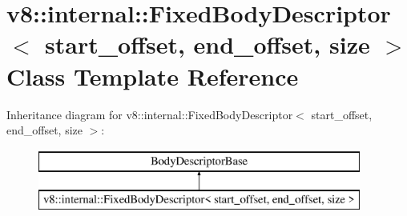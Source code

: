 \hypertarget{classv8_1_1internal_1_1_fixed_body_descriptor}{}\section{v8\+:\+:internal\+:\+:Fixed\+Body\+Descriptor$<$ start\+\_\+offset, end\+\_\+offset, size $>$ Class Template Reference}
\label{classv8_1_1internal_1_1_fixed_body_descriptor}
Inheritance diagram for v8\+:\+:internal\+:\+:Fixed\+Body\+Descriptor$<$ start\+\_\+offset, end\+\_\+offset, size $>$\+:\begin{figure}[H]
\begin{center}
\leavevmode
\includegraphics[height=2.000000cm]{classv8_1_1internal_1_1_fixed_body_descriptor}
\end{center}
\end{figure}
